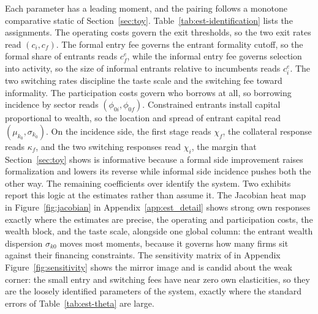 \documentclass[12pt]{article}
\begin{document}
Each parameter has a leading moment, and the pairing follows a monotone comparative static of Section~\ref{sec:toy}. Table~\ref{tab:est-identification} lists the assignments. The operating costs govern the exit thresholds, so the two exit rates read $(c_{i},c_{f})$. The formal entry fee governs the entrant formality cutoff, so the formal share of entrants reads $c^{e}_{f}$, while the informal entry fee governs selection into activity, so the size of informal entrants relative to incumbents reads $c^{e}_{i}$. The two switching rates discipline the taste scale and the switching fee toward informality. The participation costs govern who borrows at all, so borrowing incidence by sector reads $(\phi_{0i},\phi_{0f})$. Constrained entrants install capital proportional to wealth, so the location and spread of entrant capital read $(\mu_{k_{0}},\sigma_{k_{0}})$. On the incidence side, the first stage reads $\chi_{f}$, the collateral response reads $\kappa_{f}$, and the two switching responses read $\chi_{i}$, the margin that Section~\ref{sec:toy} shows is informative because a formal side improvement raises formalization and lowers its reverse while informal side incidence pushes both the other way. The remaining coefficients over identify the system. Two exhibits report this logic at the estimates rather than assume it. The Jacobian heat map in Figure~\ref{fig:jacobian} in Appendix~\ref{app:est_detail} shows strong own responses exactly where the estimates are precise, the operating and participation costs, the wealth block, and the taste scale, alongside one global column: the entrant wealth dispersion $\sigma_{k0}$ moves most moments, because it governs how many firms sit against their financing constraints. The sensitivity matrix of \citet{andrews2017measuring} in Appendix Figure~\ref{fig:sensitivity} shows the mirror image and is candid about the weak corner: the small entry and switching fees have near zero own elasticities, so they are the loosely identified parameters of the system, exactly where the standard errors of Table~\ref{tab:est-theta} are large.
\end{document}

